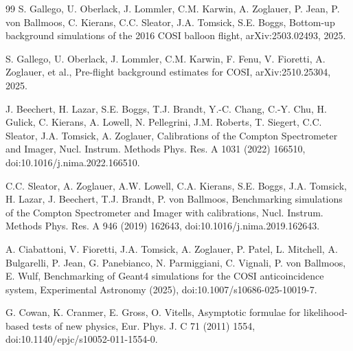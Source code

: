 \documentclass[preprint,12pt]{elsarticle}
\begin{document}
\begin{thebibliography}{99}
S. Gallego, U. Oberlack, J. Lommler, C.M. Karwin, A. Zoglauer, P. Jean, P. von Ballmoos, C. Kierans, C.C. Sleator, J.A. Tomsick, S.E. Boggs, Bottom-up background simulations of the 2016 COSI balloon flight, arXiv:2503.02493, 2025.

S. Gallego, U. Oberlack, J. Lommler, C.M. Karwin, F. Fenu, V. Fioretti, A. Zoglauer, et al., Pre-flight background estimates for COSI, arXiv:2510.25304, 2025.

J. Beechert, H. Lazar, S.E. Boggs, T.J. Brandt, Y.-C. Chang, C.-Y. Chu, H. Gulick, C. Kierans, A. Lowell, N. Pellegrini, J.M. Roberts, T. Siegert, C.C. Sleator, J.A. Tomsick, A. Zoglauer, Calibrations of the Compton Spectrometer and Imager, Nucl. Instrum. Methods Phys. Res. A 1031 (2022) 166510, doi:10.1016/j.nima.2022.166510.

C.C. Sleator, A. Zoglauer, A.W. Lowell, C.A. Kierans, S.E. Boggs, J.A. Tomsick, H. Lazar, J. Beechert, T.J. Brandt, P. von Ballmoos, Benchmarking simulations of the Compton Spectrometer and Imager with calibrations, Nucl. Instrum. Methods Phys. Res. A 946 (2019) 162643, doi:10.1016/j.nima.2019.162643.

A. Ciabattoni, V. Fioretti, J.A. Tomsick, A. Zoglauer, P. Patel, L. Mitchell, A. Bulgarelli, P. Jean, G. Panebianco, N. Parmiggiani, C. Vignali, P. von Ballmoos, E. Wulf, Benchmarking of Geant4 simulations for the COSI anticoincidence system, Experimental Astronomy (2025), doi:10.1007/s10686-025-10019-7.

G. Cowan, K. Cranmer, E. Gross, O. Vitells, Asymptotic formulae for likelihood-based tests of new physics, Eur. Phys. J. C 71 (2011) 1554, doi:10.1140/epjc/s10052-011-1554-0.

\end{thebibliography}
\end{document}
